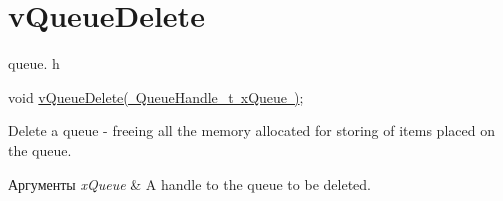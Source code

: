 \hypertarget{group__v_queue_delete}{}\section{v\+Queue\+Delete}
\label{group__v_queue_delete}
queue. h 
\begin{DoxyPre}void \mbox{\hyperlink{queue_8h_a707cbcfe3aed6b877b6aa6d9d75a3f22}{vQueueDelete( QueueHandle\_t xQueue )}};\end{DoxyPre}


Delete a queue -\/ freeing all the memory allocated for storing of items placed on the queue.


\begin{DoxyParams}{Аргументы}
{\em x\+Queue} & A handle to the queue to be deleted. \\
\hline
\end{DoxyParams}
